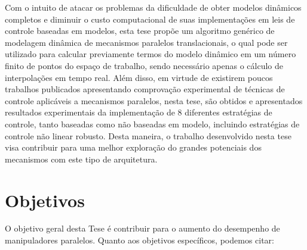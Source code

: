 \documentclass[]{politex}
\begin{document}
Com o intuito de atacar os problemas da dificuldade de obter modelos dinâmicos completos e diminuir o custo computacional de suas implementações em leis de controle baseadas em modelos, esta tese propõe um algoritmo genérico de modelagem dinâmica de mecanismos paralelos translacionais, o qual pode ser utilizado para calcular previamente termos do modelo dinâmico em um número finito de pontos do espaço de trabalho, sendo necessário apenas o cálculo de interpolações em tempo real.  Além disso, em virtude de existirem poucos  trabalhos publicados apresentando comprovação experimental de técnicas de controle aplicáveis a mecanismos paralelos, nesta tese, são obtidos e apresentados resultados experimentais da implementação de 8 diferentes estratégias de controle, tanto baseadas como não baseadas em modelo, incluindo estratégias de controle não linear robusto. Desta maneira, o trabalho desenvolvido nesta tese visa contribuir para uma melhor exploração do grandes potenciais dos mecanismos com este tipo de arquitetura.


    

\newpage
\section{Objetivos}\label{objetivos}

O objetivo geral desta Tese é contribuir para o aumento do desempenho de manipuladores paralelos. Quanto aos objetivos específicos, podemos citar:
\end{document}

